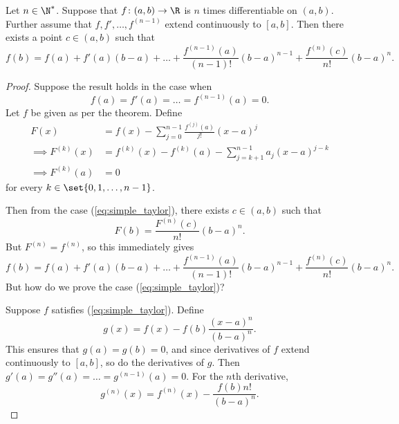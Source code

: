 \begin{theorem*} \label{thm:taylor}
    Let $n \in \N^*$.
    Suppose that
    $f\colon (a, b) \to \R$ is $n$ times differentiable on $(a, b)$.
    Further assume that $f, f', \dots, f^{(n-1)}$ extend continuously
    to $[a, b]$.
    Then there exists a point $c \in (a, b)$ such that \[
        f(b) = f(a) + f'(a)(b - a) + \dots
        + \frac{f^{(n-1)}(a)}{(n-1)!}(b - a)^{n-1} + \frac{f^{(n)}(c)}{n!}(b - a)^n.
    \]
\end{theorem*}
\begin{proof}
    Suppose the result holds in the case when \begin{equation}
        f(a) = f'(a) = \dots = f^{(n-1)}(a) = 0. \tag{$\star$}
        \label{eq:simple_taylor}
    \end{equation}
    Let $f$ be given as per the theorem.
    Define \begin{align*}
        F(x) &= f(x) - \sum_{j=0}^{n-1} \frac{f^{(j)}(a)}{j!}(x - a)^j \\
        \implies F^{(k)}(x) &= f^{(k)}(x) - f^{(k)}(a) -
            \sum_{j=k+1}^{n-1} a_j (x - a)^{j-k} \\
        \implies F^{(k)}(a) &= 0
    \end{align*} for every $k \in \set{0, 1, \dots, n-1}$.

    Then from the case (\ref{eq:simple_taylor}),
    there exists $c \in (a, b)$ such that \[
        F(b) = \frac{F^{(n)}(c)}{n!}(b - a)^n.
    \] But $F^{(n)} = f^{(n)}$, so this immediately gives \[
        f(b) = f(a) + f'(a)(b - a) + \dots
            + \frac{f^{(n-1)}(a)}{(n-1)!}(b - a)^{n-1}
            + \frac{f^{(n)}(c)}{n!}(b - a)^n.
    \]
    But how do we prove the case (\ref{eq:simple_taylor})?

    Suppose $f$ satisfies (\ref{eq:simple_taylor}).
    Define \[
        g(x) = f(x) - f(b) \frac{(x-a)^n}{(b-a)^n}.
    \] This ensures that $g(a) = g(b) = 0$, and since derivatives of $f$
    extend continuously to $[a, b]$, so do the derivatives of $g$.
    Then $g'(a) = g''(a) = \dots = g^{(n-1)}(a) = 0$.
    For the $n$th derivative, \[
        g^{(n)}(x) = f^{(n)}(x) - \frac{f(b) n!}{(b - a)^n}.
    \]


\end{proof}
